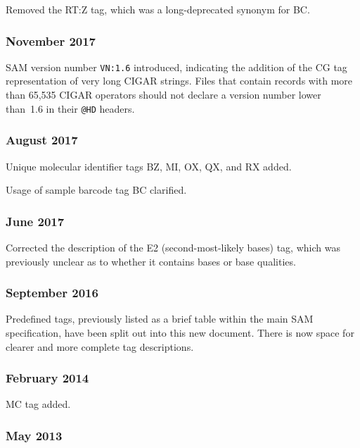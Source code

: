 \documentclass[10pt]{article}
\begin{document}
\begin{appendices}
Removed the RT:Z tag, which was a long-deprecated synonym for BC.

\subsubsection*{November 2017}

SAM version number {\tt VN:1.6} introduced, indicating the addition of the CG tag representation of very long CIGAR strings.
Files that contain records with more than 65,535 CIGAR operators should not declare a version number lower than~1.6 in their {\tt @HD} headers.

\subsubsection*{August 2017}

Unique molecular identifier tags BZ, MI, OX, QX, and RX added.

Usage of sample barcode tag BC clarified.

\subsubsection*{June 2017}

Corrected the description of the E2 (second-most-likely bases) tag, which was previously unclear as to whether it contains bases or base qualities.

\subsubsection*{September 2016}

Predefined tags, previously listed as a brief table within the main SAM specification, have been split out into this new document.
There is now space for clearer and more complete tag descriptions.

\subsubsection*{February 2014}

MC tag added.

\subsubsection*{May 2013}


\end{appendices}
\end{document}
